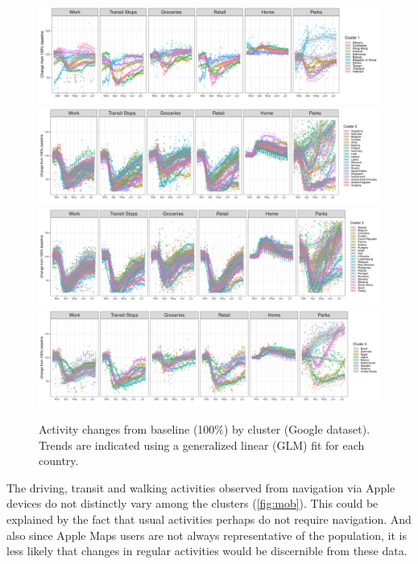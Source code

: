 \documentclass[preprint, 12pt]{elsarticle}
\newcommand{\?}{\stackrel{?}{=}}
\begin{document}
\begin{figure}[h!]
  \centering
  \includegraphics[width=\textwidth]{c1-activity}
  \includegraphics[width=\textwidth]{c2-activity}
  \includegraphics[width=\textwidth]{c3-activity}
  \includegraphics[width=\textwidth]{c4-activity}
  \caption{Activity changes from baseline (100\%) by cluster (Google dataset).  Trends are indicated using a generalized linear (GLM) fit for each country.}
  \label{fig:act}
\end{figure}


The driving, transit and walking activities observed from navigation via Apple devices do not distinctly vary among the clusters (\autoref{fig:mob}).
This could be explained by the fact that usual activities perhaps do not require navigation.
And also since Apple Maps users are not always representative of the population, it is less likely that changes in regular activities would be discernible from these data.
\end{document}
